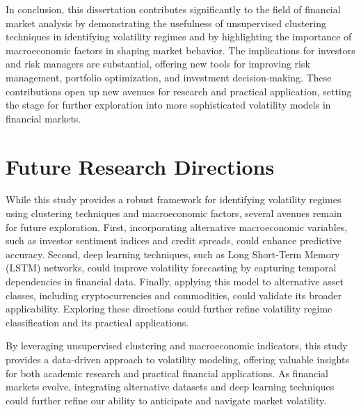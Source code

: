 In conclusion, this dissertation contributes significantly to the field of financial market analysis by demonstrating the usefulness of unsupervised clustering techniques in identifying volatility regimes and by highlighting the importance of macroeconomic factors in shaping market behavior. The implications for investors and risk managers are substantial, offering new tools for improving risk management, portfolio optimization, and investment decision-making. These contributions open up new avenues for research and practical application, setting the stage for further exploration into more sophisticated volatility models in financial markets.

\section{Future Research Directions}

While this study provides a robust framework for identifying volatility regimes using clustering techniques and macroeconomic factors, several avenues remain for future exploration. First, incorporating alternative macroeconomic variables, such as investor sentiment indices and credit spreads, could enhance predictive accuracy. Second, deep learning techniques, such as Long Short-Term Memory (LSTM) networks, could improve volatility forecasting by capturing temporal dependencies in financial data. Finally, applying this model to alternative asset classes, including cryptocurrencies and commodities, could validate its broader applicability. Exploring these directions could further refine volatility regime classification and its practical applications.

By leveraging unsupervised clustering and macroeconomic indicators, this study provides a data-driven approach to volatility modeling, offering valuable insights for both academic research and practical financial applications. As financial markets evolve, integrating alternative datasets and deep learning techniques could further refine our ability to anticipate and navigate market volatility.